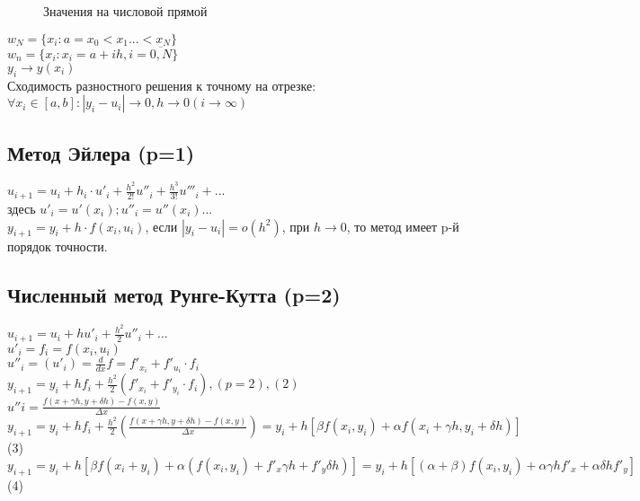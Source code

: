 \begin{figure}[H]
	\center{\texttt{[image: a\_0]}}
	\caption{Значения на числовой прямой}
\end{figure}

$w_{N} = \{x_{i} : a = x_{0} < x_{1} ... < x_{N}\}$\\
$w_{n} = \{x_{i}: x_{i} = a + ih, i = \overline{0, N}\}$\\
$y_{i} \rightarrow y(x_{i})$\\

Сходимость разностного решения к точному на отрезке:\\
$\forall x_{i} \in [a, b]: |y_{i} - u_{i}| \rightarrow 0, h \rightarrow 0 (i \rightarrow \infty)$

\subsection{Метод Эйлера (p=1)}
$u_{i+1} = u_{i} + h_{i} \cdot u'_{i} + \frac{h^{2}}{2!}u''_{i}+ \frac{h^{3}}{3!}u'''_{i} + ...$\\
здесь $u'_{i} = u'(x_{i}); u''_{i} = u''(x_{i}) ...$\\
$y_{i+1} = y_{i} + h \cdot f(x_{i}, u_{i})$, если $|y_{i} - u_{i}| = o(h^{2})$, при $h \rightarrow 0$, то метод имеет p-й порядок точности.

\subsection{Численный метод Рунге-Кутта (p=2)}
$u_{i+1} = u_{i} + h u'_{i} + \frac{h^{2}}{2}u''_{i} + ...$\\
$u'_{i} = f_{i} = f(x_{i}, u_{i})$\\
$u''_{i} = (u'_{i}) = \frac{d}{dx}f = f'_{x_{i}} + f'_{u_{i}} \cdot f_{i}$\\
$y_{i+1} = y_{i} + h f_{i} + \frac{h^{2}}{2}(f'_{x_{i}} + f'_{y_{i}} \cdot f_{i}), (p=2), (2)$\\ 
$u''{i} = \frac{f(x + \gamma h, y + \delta h) - f(x, y)}{\Delta x}$\\
$y_{i+1} = y_{i} + h f_{i} + \frac{h^{2}}{2}(\frac{f(x + \gamma h, y + \delta h) - f(x, y)}{\Delta x}) = y_{i} + h[\beta f(x_{i}, y_{i}) + \alpha f (x_{i} + \gamma h, y_{i} + \delta h)]$ (3)\\
$y_{i+1} = y_{i} + h[\beta f(x_{i} + y_{i}) + \alpha (f(x_{i}, y_{i}) + f'_{x}\gamma h + f'_{y} \delta h)] = y_{i} + h[(\alpha + \beta) f(x_{i}, y_{i}) + \alpha \gamma h f'_{x} + \alpha \delta h f'_{y}]$ (4)\\

